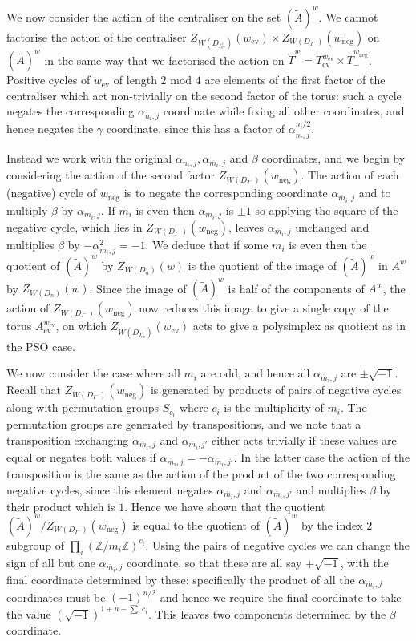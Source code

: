 \documentclass[11pt,a4paper]{article}
\def\PSO{\mathrm{PSO}}
\def\Z{\mathbb{Z}}
\def\Atilde{(\widetilde{A})}
\def\mbar{\overline{m}}
\def\mbar{\overline{m}}
\def\coveringtorus{\tilde{T}}
\def\ev{\mathrm{ev}}
\def\neg{\mathrm{neg}}
\begin{document}
We now consider the action of the centraliser on the set $\Atilde^{w}$. We cannot factorise the action of the centraliser $Z_{W(D_{I^+_{\ev}})}(w_\ev) \times Z_{W(D_{I^-})}(w_\neg)$ on $\Atilde^{w}$ in the same way that we factorised the action on $\coveringtorus^w=T_{\ev}^{w_\ev}\times \coveringtorus_-^{w_\neg}$. Positive cycles of $w_\ev$ of length $2$ mod $4$ are elements of the first factor of the centraliser which act non-trivially on the second factor of the torus: such a cycle negates the corresponding $\alpha_{n_i,j}$ coordinate while fixing all other coordinates, and hence negates the $\gamma$ coordinate, since this has a factor of $\alpha_{n_i,j}^{n_i/2}$.

Instead we work with the original $\alpha_{n_i,j},\alpha_{\mbar_i,j}$ and $\beta$ coordinates, and we begin by considering the action of the second factor $Z_{W(D_{I^-})}(w_\neg)$. The action of each (negative) cycle of $w_\neg$ is to negate the corresponding coordinate $\alpha_{\mbar_i,j}$ and to multiply $\beta$ by $\alpha_{\mbar_i,j}$.  If $m_i$ is even then $\alpha_{\mbar_i,j}$ is $\pm 1$ so applying the square of the negative cycle, which lies in  $Z_{W(D_{I^-})}(w_\neg)$, leaves $\alpha_{\mbar_i,j}$ unchanged and multiplies $\beta$ by $-\alpha_{\mbar_i,j}^2=-1$. We deduce that if some $m_i$ is even then the quotient of $\Atilde^w$ by $Z_{W(D_n)}(w)$ is the quotient of the image of $\Atilde^w$ in $A^w$ by $Z_{W(D_n)}(w)$. Since the image of $\Atilde^w$ is half of the components of $A^w$, the action of $Z_{W(D_{I^-})}(w_\neg)$ now reduces this image to give a single copy of the torus $A_\ev^{w_\ev}$, on which $Z_{W(D_{I^+_\ev})}(w_\ev)$ acts to give a polysimplex as quotient as in the $\PSO$ case.

We now consider the case where all $m_i$ are odd, and hence all $\alpha_{\mbar_i,j}$ are $\pm \sqrt{-1}$. Recall that $Z_{W(D_{I^-})}(w_\neg)$ is generated by products of pairs of negative cycles along with permutation groups $S_{c_i}$ where $c_i$ is the multiplicity of $m_i$. The permutation groups are generated by transpositions, and we note that a transposition exchanging $\alpha_{\mbar_i,j}$ and $\alpha_{\mbar_i,j'}$ either acts trivially if these values are equal or negates both values if $\alpha_{\mbar_i,j}=-\alpha_{\mbar_i,j'}$.  In the latter case the action of the transposition is the same as the action of the product of the two corresponding negative cycles, since this element negates $\alpha_{\mbar_i,j}$ and $\alpha_{\mbar_i,j'}$ and multiplies $\beta$ by their product which is $1$. Hence we have shown that the quotient $\Atilde^w/Z_{W(D_{I^-})}(w_\neg)$ is equal to the quotient of $\Atilde^w$ by the index $2$ subgroup of $\prod_i (\Z/m_i\Z)^{c_i}$. Using the pairs of negative cycles we can change the sign of all but one $\alpha_{\mbar_i,j}$ coordinate, so that these are all say $+\sqrt{-1}$, with the final coordinate determined by these: specifically the product of all the $\alpha_{\mbar_i,j}$ coordinates must be $(-1)^{n/2}$ and hence we require the final coordinate to take the value $(\sqrt{-1})^{1+n-\sum_ic_i}$. This leaves two components determined by the $\beta$ coordinate.
\end{document}
